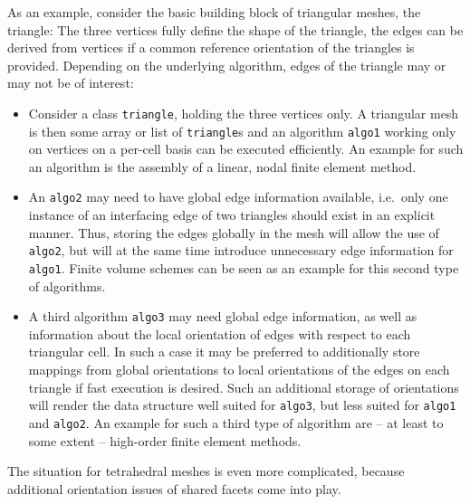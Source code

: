 As an example, consider the basic building block of triangular meshes, the triangle:
The three vertices fully define the shape of the triangle, the edges can be derived from vertices if a common reference orientation of the triangles is provided.
Depending on the underlying algorithm, edges of the triangle may or may not be of interest:
\begin{itemize}
 \item Consider a class \lstinline|triangle|, holding the three vertices only.
       A triangular mesh is then some array or list of \lstinline|triangle|s and an algorithm \texttt{algo1} working only on vertices on a per-cell basis can be executed efficiently.
       An example for such an algorithm is the assembly of a linear, nodal finite element method.

 \item An \texttt{algo2} may need to have global edge information available, i.e.~only one instance of an interfacing edge of two triangles should exist in an explicit manner.
       Thus, storing the edges globally in the mesh will allow the use of \texttt{algo2}, but will at the same time introduce unnecessary edge information for \texttt{algo1}.
       Finite volume schemes can be seen as an example for this second type of algorithms.

 \item A third algorithm \texttt{algo3} may need global edge information, as well as information about the local orientation of edges with respect to each triangular cell.
      In such a case it may be preferred to additionally store mappings from global orientations to local orientations of the edges on each triangle if fast execution is desired.
      Such an additional storage of orientations will render the data structure well suited for \texttt{algo3}, but less suited for \texttt{algo1} and \texttt{algo2}.
      An example for such a third type of algorithm are -- at least to some extent -- high-order finite element methods.
\end{itemize}
The situation for tetrahedral meshes is even more complicated, because additional orientation issues of shared facets come into play.

